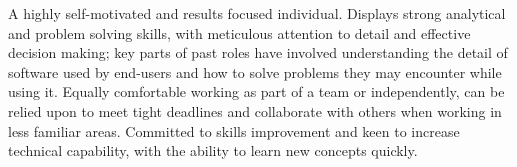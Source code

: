A highly self-motivated and results focused individual. Displays strong analytical and problem solving skills, with meticulous attention to detail and effective decision making; key parts of past roles have involved understanding the detail of software used by end-users and how to solve problems they may encounter while using it. Equally comfortable working as part of a team or independently, can be relied upon to meet tight deadlines and collaborate with others when working in less familiar areas. Committed to skills improvement and keen to increase technical capability, with the ability to learn new concepts quickly.
